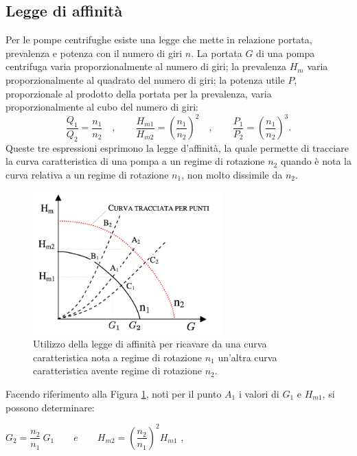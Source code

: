 \documentclass[laurea,oneside,11pt]{USiena_tesiLM3}
\begin{document}
\subsection{Legge di affinità}
Per le pompe centrifughe esiste una legge \cite{lobanoff2013centrifugal} che mette in relazione portata, prevalenza e potenza con il numero di giri $n$.
La portata $G$ di una pompa centrifuga varia proporzionalmente al numero di giri; la prevalenza $H_m$ varia proporzionalmente al quadrato del numero di giri; la potenza utile $P$, proporzionale al prodotto della portata per la prevalenza, varia proporzionalmente al cubo del numero di giri:
\begin{equation}
\frac{Q_1}{Q_2}=\frac{n_1}{n_2} \quad , \qquad  \frac{H_{m1}}{H_{m2}}=\left( \frac{n_1}{n_2}\right)^2 \quad , \qquad  \frac{P_1}{P_2}=\left( \frac{n_1}{n_2}\right)^3 .
\label{eq:affinita}
\end{equation}
Queste tre espressioni esprimono la legge d'affinità, la quale permette di tracciare la curva caratteristica di una pompa a un regime di rotazione $n_2$ quando è nota la curva relativa a un regime di rotazione $n_1$, non molto dissimile da $n_2$.

\begin{figure}[!ht]
\centering
\includegraphics[width=0.65\textwidth]{figure/affinita} 
\caption{Utilizzo della legge di affinità per ricavare da una curva caratteristica nota a regime di rotazione $n_1$ un'altra curva caratteristica avente regime di rotazione $n_2$.}
\label{fig:affinita}
\end{figure}

Facendo riferimento alla Figura \ref{fig:affinita}, noti per il punto $A_1$ i valori di $G_1$ e $H_{m1}$, si possono determinare:

\begin{center}
$G_2 = \dfrac{n_2}{n_1} \ G_1 \qquad e \qquad H_{m2} = \left( \dfrac{n_2}{n_1}\right)^2  H_{m1}$ ,
\end{center}
\end{document}
